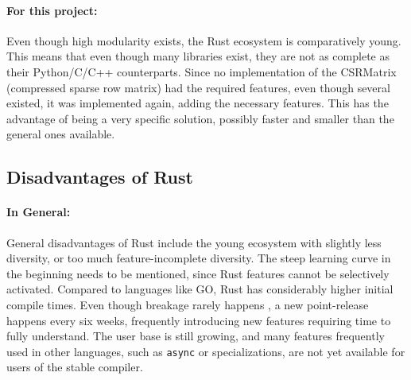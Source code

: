 \paragraph{For this project:} Even though high modularity exists, the Rust
ecosystem is comparatively young. This means that even though many libraries
exist, they are not as complete as their Python/C/C++ counterparts. Since no
implementation of the CSRMatrix (compressed sparse row matrix) had the required
features, even though several existed, it was implemented again,
adding the necessary features. This has the advantage of being a very specific
solution, possibly faster and smaller than the general ones available.








\subsection{Disadvantages of Rust}\label{sec:RustDisadvantages}


\paragraph{In General:} General disadvantages of Rust include the young ecosystem
with slightly less diversity, or too much feature-incomplete diversity. The
steep learning curve in the beginning needs to be mentioned, since Rust
features cannot be selectively activated. Compared to languages like GO, Rust
has considerably higher initial compile times. Even though breakage rarely
happens \cite{rustupdate}, a new point-release happens every six weeks,
frequently introducing new features requiring time to fully understand. The
user base is still growing, and many features frequently used in other
languages, such as \verb|async| or specializations, are not yet available for
users of the stable compiler.


